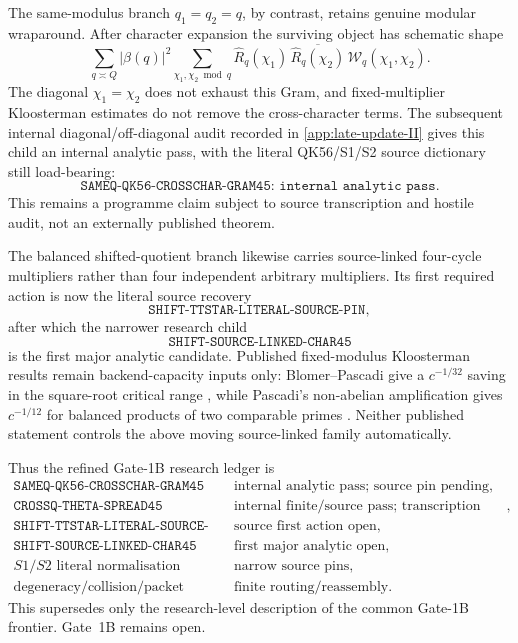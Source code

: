 \documentclass[11pt]{article}
\theoremstyle{definition}
\newcommand{\1}{\mathbf 1}
\begin{document}
The same-modulus branch $q_1=q_2=q$, by contrast, retains genuine modular
wraparound.  After character expansion the surviving object has schematic
shape
\[
 \sum_{q\asymp Q}|\beta(q)|^2
 \sum_{\chi_1,\chi_2\bmod q}
 \widehat R_q(\chi_1)\,
 \overline{\widehat R_q(\chi_2)}\,
 \mathcal W_q(\chi_1,\chi_2).
\]
The diagonal $\chi_1=\chi_2$ does not exhaust this Gram, and fixed-multiplier
Kloosterman estimates do not remove the cross-character terms.  The subsequent internal diagonal/off-diagonal audit recorded in
\cref{app:late-update-II} gives this child an internal analytic pass, with the
literal QK56/S1/S2 source dictionary still load-bearing:
\[
   \boxed{\texttt{SAMEQ-QK56-CROSSCHAR-GRAM45: internal analytic pass}}.
\]
This remains a programme claim subject to source transcription and hostile
audit, not an externally published theorem.

The balanced shifted-quotient branch likewise carries source-linked four-cycle
multipliers rather than four independent arbitrary multipliers.  Its first
required action is now the literal source recovery
\[
   \boxed{\texttt{SHIFT-TTSTAR-LITERAL-SOURCE-PIN}},
\]
after which the narrower research child
\[
   \boxed{\texttt{SHIFT-SOURCE-LINKED-CHAR45}}
\]
is the first major analytic candidate.  Published
fixed-modulus Kloosterman results remain backend-capacity inputs only:
Blomer--Pascadi give a $c^{-1/32}$ saving in the square-root critical range
\cite{BlomerPascadi2026}, while Pascadi's non-abelian amplification gives
$c^{-1/12}$ for balanced products of two comparable primes
\cite{Pascadi2025}.  Neither published statement controls the above moving
source-linked family automatically.

Thus the refined Gate-1B research ledger is
\[
\begin{array}{ll}
 \texttt{SAMEQ-QK56-CROSSCHAR-GRAM45}
   & \text{internal analytic pass; source pin pending},\\
 \texttt{CROSSQ-THETA-SPREAD45}
   & \text{internal finite/source pass; transcription pending},\\
 \texttt{SHIFT-TTSTAR-LITERAL-SOURCE-PIN}
   & \text{source first action open},\\
 \texttt{SHIFT-SOURCE-LINKED-CHAR45}
   & \text{first major analytic open},\\
 S1/S2\text{ literal normalisation}
   & \text{narrow source pins},\\
 \text{degeneracy/collision/packet census}
   & \text{finite routing/reassembly}.
\end{array}
\]
This supersedes only the research-level description of the common Gate-1B
frontier.  Gate~1B remains open.
\end{document}
